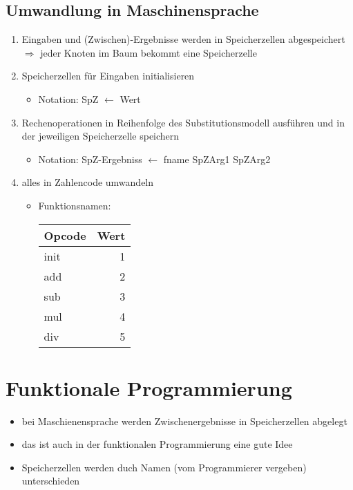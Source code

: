 \documentclass[a4paper]{scrartcl}
\begin{document}
\subsection{Umwandlung in Maschinensprache}
\label{sec-7-1}
\begin{enumerate}
\item Eingaben und (Zwischen)-Ergebnisse werden in Speicherzellen abgespeichert $\Rightarrow$ jeder Knoten im Baum bekommt eine Speicherzelle
\item Speicherzellen für Eingaben initialisieren
\begin{itemize}
\item Notation: SpZ $\leftarrow$ Wert
\end{itemize}
\item Rechenoperationen in Reihenfolge des Substitutionsmodell ausführen und in der jeweiligen Speicherzelle speichern
\begin{itemize}
\item Notation: SpZ-Ergebniss $\leftarrow$ fname SpZArg1 SpZArg2
\end{itemize}
\item alles in Zahlencode umwandeln
\begin{itemize}
\item Funktionsnamen:
\begin{center}
\begin{tabular}{lr}
Opcode & Wert\\
\hline
init & 1\\
add & 2\\
sub & 3\\
mul & 4\\
div & 5\\
\end{tabular}
\end{center}
\end{itemize}
\end{enumerate}
\section{Funktionale Programmierung}
\label{sec-8}
\begin{itemize}
\item bei Maschienensprache werden Zwischenergebnisse in Speicherzellen abgelegt
\item das ist auch in der funktionalen Programmierung eine gute Idee
\item Speicherzellen werden duch Namen (vom Programmierer vergeben) unterschieden
\end{itemize}
\end{document}
